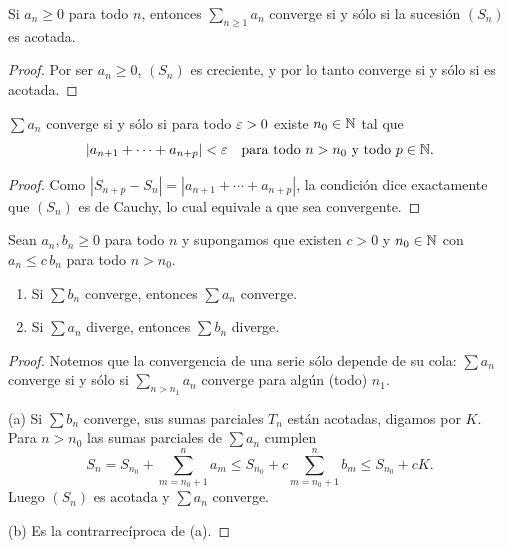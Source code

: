 \begin{theorem}
  Si \(a_n \geq 0\) para todo \(n\), entonces \(\sum_{n \geq 1} a_n\) converge si y sólo si la sucesión \({(S_n)}\) es acotada.
\end{theorem}

\begin{proof}
  Por ser \(a_n \geq 0\), \({(S_n)}\) es creciente, y por lo tanto converge si y sólo si es acotada.
\end{proof}

\begin{theorem}
  \(\sum a_n\) converge si y sólo si para todo \(\varepsilon > 0\) existe \(n_0 \in \mathbb{N}\) tal que
  \[
    |a_{n+1} + \cdots + a_{n+p}| < \varepsilon \quad \text{para todo } n > n_0 \text{ y todo } p \in \mathbb{N}.
  \]
\end{theorem}

\begin{proof}
  Como \(|S_{n+p} - S_n| = |a_{n+1} + \cdots + a_{n+p}|\), la condición dice exactamente que \({(S_n)}\) es de Cauchy, lo cual equivale a que sea convergente.
\end{proof}

\begin{theorem}
  Sean \(a_n, b_n \geq 0\) para todo \(n\) y supongamos que existen \(c > 0\) y \(n_0 \in \mathbb{N}\) con \(a_n \leq c\, b_n\) para todo \(n > n_0\).
  \begin{enumerate}[label=(\alph*)]
    \item Si \(\sum b_n\) converge, entonces \(\sum a_n\) converge.
    \item Si \(\sum a_n\) diverge, entonces \(\sum b_n\) diverge.
  \end{enumerate}
\end{theorem}

\begin{proof}
  Notemos que la convergencia de una serie sólo depende de su cola: \(\sum a_n\) converge si y sólo si \(\sum_{n > n_1} a_n\) converge para algún (todo) \(n_1\).

  (a) Si \(\sum b_n\) converge, sus sumas parciales \(T_n\) están acotadas, digamos por \(K\). Para \(n > n_0\) las sumas parciales de \(\sum a_n\) cumplen
  \[
    S_n = S_{n_0} + \sum_{m = n_0 + 1}^{n} a_m \leq S_{n_0} + c \sum_{m = n_0 + 1}^{n} b_m \leq S_{n_0} + c K.
  \]
  Luego \({(S_n)}\) es acotada y \(\sum a_n\) converge.

  (b) Es la contrarrecíproca de (a).
\end{proof}

